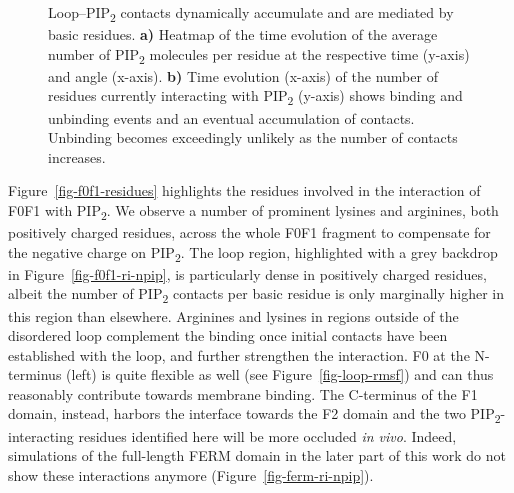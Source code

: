 \documentclass[
  twocolumn]{biophys-new-mod}
\begin{document}
\begin{figure}
\begin{minipage}[t]{\linewidth}
{{}

}

\subcaption{\label{fig-f0f1-retention}~}
\end{minipage}%

\caption{\label{fig-loop-importance-2}Loop--PIP\textsubscript{2}
contacts dynamically accumulate and are mediated by basic residues.
\textbf{a)} Heatmap of the time evolution of the average number of
PIP\textsubscript{2} molecules per residue at the respective time
(y-axis) and angle (x-axis). \textbf{b)} Time evolution (x-axis) of the
number of residues currently interacting with PIP\textsubscript{2}
(y-axis) shows binding and unbinding events and an eventual accumulation
of contacts. Unbinding becomes exceedingly unlikely as the number of
contacts increases.}

\end{figure}

Figure~\ref{fig-f0f1-residues} highlights the residues involved in the
interaction of F0F1 with PIP\textsubscript{2}. We observe a number of
prominent lysines and arginines, both positively charged residues,
across the whole F0F1 fragment to compensate for the negative charge on
PIP\textsubscript{2}. The loop region, highlighted with a grey backdrop
in Figure~\ref{fig-f0f1-ri-npip}, is particularly dense in positively
charged residues, albeit the number of PIP\textsubscript{2} contacts per
basic residue is only marginally higher in this region than elsewhere.
Arginines and lysines in regions outside of the disordered loop
complement the binding once initial contacts have been established with
the loop, and further strengthen the interaction. F0 at the N-terminus
(left) is quite flexible as well (see Figure~\ref{fig-loop-rmsf}) and
can thus reasonably contribute towards membrane binding. The C-terminus
of the F1 domain, instead, harbors the interface towards the F2 domain
and the two PIP\textsubscript{2}-interacting residues identified here
will be more occluded \emph{in vivo}. Indeed, simulations of the
full-length FERM domain in the later part of this work do not show these
interactions anymore (Figure~\ref{fig-ferm-ri-npip}).
\end{document}
